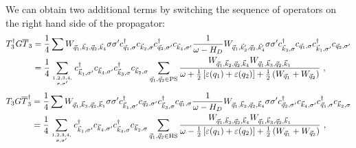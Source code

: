 \documentclass{revtex4-2}
\begin{document}
We can obtain two additional terms by switching the sequence of operators on the right hand side of the propagator:
\begin{equation}\begin{aligned}
	T_3^\dagger G \overline T_3 &= \frac{1}{4}\sum W_{\vec q_1,\vec k_2, \vec q_2, \vec k_4} \sigma\sigma^\prime c^\dagger_{\vec q_1,\sigma}c_{\vec k_2,\sigma}c^\dagger_{\vec q_2,\sigma^\prime}c_{\vec k_4,\sigma^\prime} \frac{1}{\omega - H_D} W_{\vec q_1,\vec k_2^\prime, \vec q_2, \vec k_4^\prime} \sigma\sigma^\prime c^\dagger_{\vec k_3,\sigma} c_{\vec q_1,\sigma} c^\dagger_{\vec k_1,\sigma^\prime} c_{\vec q_2,\sigma^\prime}\\
			  &= \frac{1}{4}\sum_{1,2,3,4,\atop{\sigma,\sigma^\prime}} c^\dagger_{\vec k_1,\sigma^\prime} c_{\vec k_4,\sigma^\prime} c^\dagger_{\vec k_3,\sigma}c_{\vec k_2,\sigma}  \sum_{\vec q_1, \vec q_2 \in \text{PS}}\frac{W_{\vec q_1,\vec k_2, \vec q_2, \vec k_4} W_{\vec q_1,\vec k_3, \vec q_2, \vec k_1}}{\omega + \frac{1}{2}\left[\varepsilon(q_1) + \varepsilon(q_2)\right] + \frac{1}{2}\left(W_{\vec q_1} + W_{\vec q_2}\right)}~,
\end{aligned}\end{equation}
\begin{equation}\begin{aligned}
	T_3 G \overline T_3^\dagger &= \frac{1}{4}\sum  W_{\vec q_1,\vec k_3, \vec q_2, \vec k_1} \sigma\sigma^\prime c^\dagger_{\vec k_1,\sigma^\prime} c_{\vec q_2,\sigma^\prime} c^\dagger_{\vec k_3,\sigma} c_{\vec q_1,\sigma}\frac{1}{\omega - H_D}W_{\vec q_1,\vec k_2, \vec q_2, \vec k_4} \sigma\sigma^\prime c^\dagger_{\vec q_2,\sigma^\prime}c_{\vec k_4,\sigma^\prime} c^\dagger_{\vec q_1,\sigma}c_{\vec k_2,\sigma} \\
			  &= \frac{1}{4}\sum_{1,2,3,4,\atop{\sigma,\sigma^\prime}} c^\dagger_{\vec k_1,\sigma^\prime}  c_{\vec k_4,\sigma^\prime} c^\dagger_{\vec k_3,\sigma}  c_{\vec k_2,\sigma} \sum_{\vec q_1, \vec q_2 \in \text{HS}}\frac{W_{\vec q_1,\vec k_2, \vec q_2, \vec k_4} W_{\vec q_1,\vec k_3, \vec q_2, \vec k_1}}{\omega - \frac{1}{2}\left[\varepsilon(q_1) + \varepsilon(q_2)\right] + \frac{1}{2}\left(W_{\vec q_1} + W_{\vec q_2}\right)}~,
\end{aligned}\end{equation}
\end{document}
